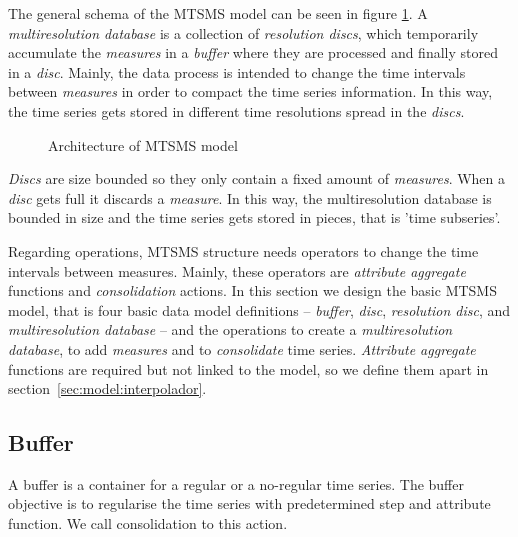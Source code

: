 The general schema of the MTSMS model can be seen in figure
\ref{fig:model:mtsdb}.  A \emph{multiresolution database} is a
collection of \emph{resolution discs}, which temporarily accumulate
the \emph{measures} in a \emph{buffer} where they are processed and
finally stored in a \emph{disc}. Mainly, the data process is intended
to change the time intervals between \emph{measures} in order to
compact the time series information. In this way, the time series gets
stored in different time resolutions spread in the
\emph{discs}.


\begin{figure}[tp]
\centering

\caption{Architecture of MTSMS model}
\label{fig:model:mtsdb}
\end{figure}

\emph{Discs} are size bounded so they only contain a fixed amount of
\emph{measures}. When a \emph{disc} gets full it discards a
\emph{measure}. In this way, the multiresolution database is bounded
in size and the time series gets stored in pieces, that is 'time
subseries'.




Regarding operations, MTSMS structure needs operators to change the time
intervals between measures. Mainly, these operators are
\emph{attribute aggregate} functions and \emph{consolidation}
actions. In this section we design the basic MTSMS model, that is four
basic data model definitions -- \emph{buffer}, \emph{disc},
\emph{resolution disc}, and \emph{multiresolution database} -- and the
operations to create a \emph{multiresolution database}, to add
\emph{measures} and to \emph{consolidate} time series. \emph{Attribute
  aggregate} functions are required but not linked to the model, so we
define them apart in section~\ref{sec:model:interpolador}.






\subsection{Buffer}\label{sec:model:buffer}

A buffer is a container for a regular or a no-regular time series. The
buffer objective is to regularise the time series with predetermined step 
and attribute function. We call consolidation to this action. 

